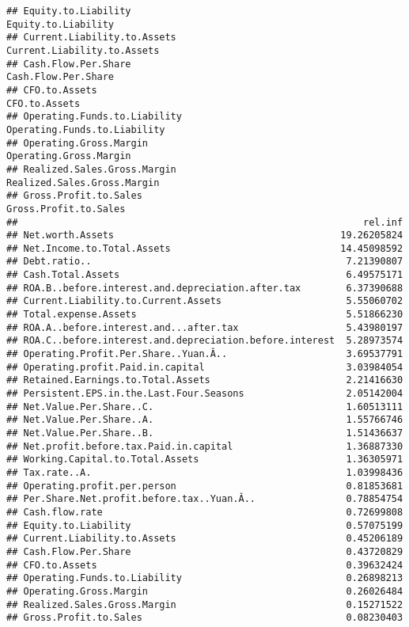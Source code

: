 \documentclass[
]{article}
\begin{document}
\begin{verbatim}
## Equity.to.Liability                                                                         Equity.to.Liability
## Current.Liability.to.Assets                                                         Current.Liability.to.Assets
## Cash.Flow.Per.Share                                                                         Cash.Flow.Per.Share
## CFO.to.Assets                                                                                     CFO.to.Assets
## Operating.Funds.to.Liability                                                       Operating.Funds.to.Liability
## Operating.Gross.Margin                                                                   Operating.Gross.Margin
## Realized.Sales.Gross.Margin                                                         Realized.Sales.Gross.Margin
## Gross.Profit.to.Sales                                                                     Gross.Profit.to.Sales
##                                                             rel.inf
## Net.worth.Assets                                        19.26205824
## Net.Income.to.Total.Assets                              14.45098592
## Debt.ratio..                                             7.21390807
## Cash.Total.Assets                                        6.49575171
## ROA.B..before.interest.and.depreciation.after.tax        6.37390688
## Current.Liability.to.Current.Assets                      5.55060702
## Total.expense.Assets                                     5.51866230
## ROA.A..before.interest.and...after.tax                   5.43980197
## ROA.C..before.interest.and.depreciation.before.interest  5.28973574
## Operating.Profit.Per.Share..Yuan.Â..                     3.69537791
## Operating.profit.Paid.in.capital                         3.03984054
## Retained.Earnings.to.Total.Assets                        2.21416630
## Persistent.EPS.in.the.Last.Four.Seasons                  2.05142004
## Net.Value.Per.Share..C.                                  1.60513111
## Net.Value.Per.Share..A.                                  1.55766746
## Net.Value.Per.Share..B.                                  1.51436637
## Net.profit.before.tax.Paid.in.capital                    1.36887330
## Working.Capital.to.Total.Assets                          1.36305971
## Tax.rate..A.                                             1.03998436
## Operating.profit.per.person                              0.81853681
## Per.Share.Net.profit.before.tax..Yuan.Â..                0.78854754
## Cash.flow.rate                                           0.72699808
## Equity.to.Liability                                      0.57075199
## Current.Liability.to.Assets                              0.45206189
## Cash.Flow.Per.Share                                      0.43720829
## CFO.to.Assets                                            0.39632424
## Operating.Funds.to.Liability                             0.26898213
## Operating.Gross.Margin                                   0.26026484
## Realized.Sales.Gross.Margin                              0.15271522
## Gross.Profit.to.Sales                                    0.08230403
\end{verbatim}
\end{document}
